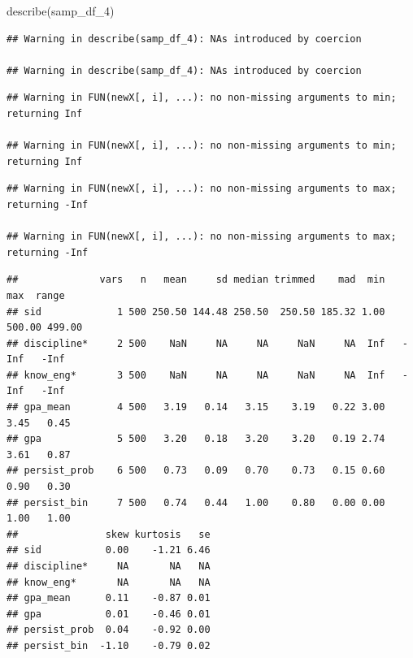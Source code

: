 \documentclass[
]{book}
\newenvironment{Shaded}{\begin{snugshade}}{\end{snugshade}}
\newcommand{\FunctionTok}[1]{\textcolor[rgb]{0.00,0.00,0.00}{#1}}
\newcommand{\NormalTok}[1]{#1}
\newcommand{\SpecialCharTok}[1]{\textcolor[rgb]{0.00,0.00,0.00}{#1}}
\begin{document}
\begin{Shaded}
\begin{Highlighting}[]
\FunctionTok{describe}\NormalTok{(samp\_df\_4)}
\end{Highlighting}
\end{Shaded}

\begin{verbatim}
## Warning in describe(samp_df_4): NAs introduced by coercion

## Warning in describe(samp_df_4): NAs introduced by coercion
\end{verbatim}

\begin{verbatim}
## Warning in FUN(newX[, i], ...): no non-missing arguments to min; returning Inf

## Warning in FUN(newX[, i], ...): no non-missing arguments to min; returning Inf
\end{verbatim}

\begin{verbatim}
## Warning in FUN(newX[, i], ...): no non-missing arguments to max; returning -Inf

## Warning in FUN(newX[, i], ...): no non-missing arguments to max; returning -Inf
\end{verbatim}

\begin{verbatim}
##              vars   n   mean     sd median trimmed    mad  min    max  range
## sid             1 500 250.50 144.48 250.50  250.50 185.32 1.00 500.00 499.00
## discipline*     2 500    NaN     NA     NA     NaN     NA  Inf   -Inf   -Inf
## know_eng*       3 500    NaN     NA     NA     NaN     NA  Inf   -Inf   -Inf
## gpa_mean        4 500   3.19   0.14   3.15    3.19   0.22 3.00   3.45   0.45
## gpa             5 500   3.20   0.18   3.20    3.20   0.19 2.74   3.61   0.87
## persist_prob    6 500   0.73   0.09   0.70    0.73   0.15 0.60   0.90   0.30
## persist_bin     7 500   0.74   0.44   1.00    0.80   0.00 0.00   1.00   1.00
##               skew kurtosis   se
## sid           0.00    -1.21 6.46
## discipline*     NA       NA   NA
## know_eng*       NA       NA   NA
## gpa_mean      0.11    -0.87 0.01
## gpa           0.01    -0.46 0.01
## persist_prob  0.04    -0.92 0.00
## persist_bin  -1.10    -0.79 0.02
\end{verbatim}

\begin{Shaded}
\end{Shaded}
\end{document}
